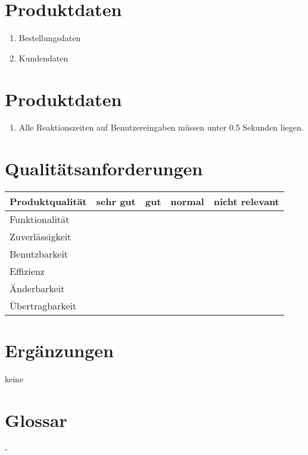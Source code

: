 \section{Produktdaten}
\begin{enumerate}[/LD10/]
	\item Bestellungsdaten
	\item Kundendaten
\end{enumerate}
\section{Produktdaten}
\begin{enumerate}[/LL10/]
	\item Alle Reaktionszeiten auf Benutzereingaben müssen unter 0.5  Sekunden liegen.
\end{enumerate}
\section{Qualitätsanforderungen}
\begin{tabular}{l|cccc}
	Produktqualität&sehr gut&gut&normal&nicht relevant\\\hline
	Funktionalität&&&\texttimes&\\
	Zuverlässigkeit&&\texttimes&&\\
	Benutzbarkeit&\texttimes&&&\\
	Effizienz&&&&\texttimes\\
	Änderbarkeit&&&\texttimes&\\
	Übertragbarkeit&&&&\texttimes
\end{tabular}
\section{Ergänzungen}
keine
\section*{Glossar}
-
